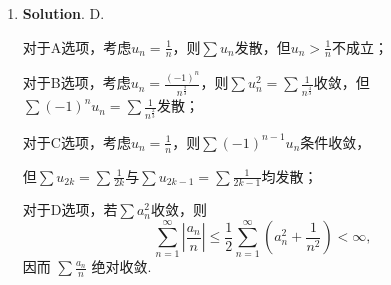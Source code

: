 \documentclass[../main.tex]{subfiles}
\begin{document}
\begin{enumerate}
        C、D均满足 \(P_y=\dfrac1{y^2}\)，但$P=\frac{1}{x}-\frac{1}{y}$在$x=0$处无定义，故选C.

  \item \textbf{Solution}. D.

        对于A选项，考虑$u_n=\frac{1}{n}$，则$\sum u_n$发散，但$u_n>\frac{1}{n}$不成立；

        对于B选项，考虑$u_n=\frac{(-1)^{n}}{n^{\frac{2}{3}}}$，则$\sum u_n^2=\sum \frac{1}{n^{\frac{4}{3}}}$收敛，但$\sum (-1)^n u_n=\sum \frac{1}{n^{\frac{2}{3}}}$发散；

        对于C选项，考虑$u_n=\frac{1}{n}$，则$\sum (-1)^{n-1}u_n$条件收敛，

        但$\sum u_{2k}=\sum \frac{1}{2k}$与$\sum u_{2k-1}=\sum \frac{1}{2k-1}$均发散；

        对于D选项，若$\sum a_n^2$收敛，则
        \[
          \sum_{n=1}^{\infty}\left|\frac{a_n}{n}\right|
          \le \frac{1}{2}\sum_{n=1}^{\infty}\left(a_n^2+\frac{1}{n^2}\right) < \infty,
        \]
        因而 \(\sum \frac{a_n}{n}\) 绝对收敛.

\end{enumerate}
\end{document}
